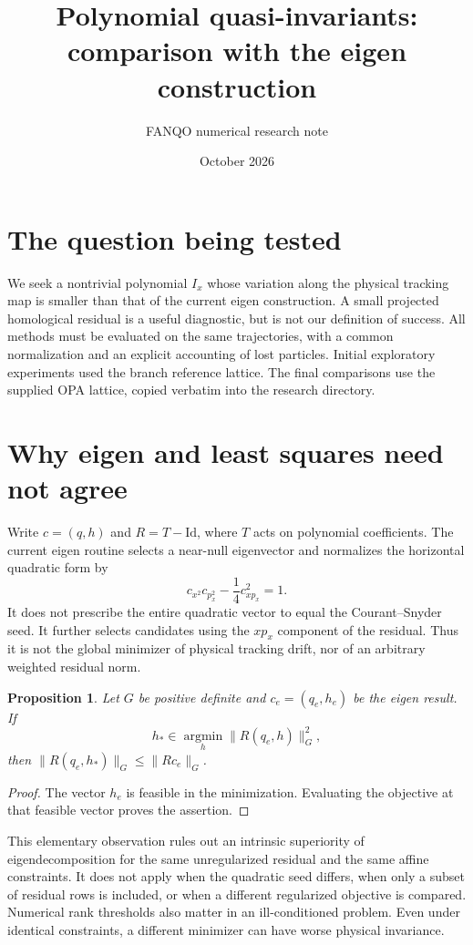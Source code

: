 \documentclass[11pt]{article}
\title{Polynomial quasi-invariants: comparison with the eigen construction}
\author{FANQO numerical research note}
\date{October 2026}
\newtheorem{proposition}{Proposition}
\begin{document}
\maketitle
\section{The question being tested}
We seek a nontrivial polynomial $I_x$ whose variation along the physical tracking map is smaller than that of the current eigen construction. A small projected homological residual is a useful diagnostic, but is not our definition of success. All methods must be evaluated on the same trajectories, with a common normalization and an explicit accounting of lost particles. Initial exploratory experiments used the branch reference lattice. The final comparisons use the supplied OPA lattice, copied verbatim into the research directory.

\section{Why eigen and least squares need not agree}
Write $c=(q,h)$ and $R=T-\mathrm{Id}$, where $T$ acts on polynomial coefficients. The current eigen routine selects a near-null eigenvector and normalizes the horizontal quadratic form by
\[
 c_{x^2}c_{p_x^2}-\frac14c_{xp_x}^2=1.
\]
It does not prescribe the entire quadratic vector to equal the Courant--Snyder seed. It further selects candidates using the $xp_x$ component of the residual. Thus it is not the global minimizer of physical tracking drift, nor of an arbitrary weighted residual norm.

\begin{proposition}
Let $G$ be positive definite and $c_e=(q_e,h_e)$ be the eigen result. If
\[
 h_*\in\operatorname*{argmin}_h\|R(q_e,h)\|_G^2,
\]
then $\|R(q_e,h_*)\|_G\leq\|Rc_e\|_G$.
\end{proposition}
\begin{proof}
The vector $h_e$ is feasible in the minimization. Evaluating the objective at that feasible vector proves the assertion.
\end{proof}
This elementary observation rules out an intrinsic superiority of eigendecomposition for the same unregularized residual and the same affine constraints. It does not apply when the quadratic seed differs, when only a subset of residual rows is included, or when a different regularized objective is compared. Numerical rank thresholds also matter in an ill-conditioned problem. Even under identical constraints, a different minimizer can have worse physical invariance.
\end{document}
